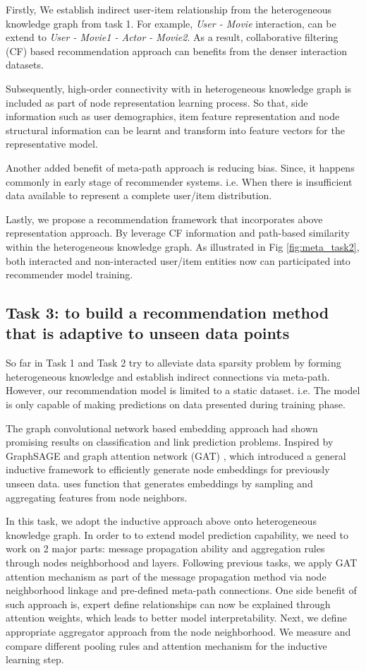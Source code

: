 Firstly, We establish indirect user-item relationship from the heterogeneous knowledge graph from task 1. For example, \textit{User - Movie} interaction, can be extend to \textit{User - Movie1 - Actor - Movie2}. As a result, collaborative filtering (CF) based recommendation approach can benefits from the denser interaction datasets. 

Subsequently, high-order connectivity with in heterogeneous knowledge graph is included as part of node representation learning process. So that, side information such as user demographics, item feature representation and node structural information can be learnt and transform into feature vectors for the representative model. 

Another added benefit of meta-path approach is reducing bias. Since, it happens commonly in early stage of recommender systems. i.e. When there is insufficient data available to represent a complete user/item distribution. 

Lastly, we propose a recommendation framework that incorporates above representation approach. By leverage CF information and path-based similarity within the heterogeneous knowledge graph. As illustrated in Fig \ref{fig:meta_task2}, both interacted and non-interacted user/item entities now can participated into recommender model training.

\subsection*{Task 3: to build a recommendation method that is adaptive to unseen data points}

So far in Task 1 and Task 2 try to alleviate data sparsity problem by forming heterogeneous knowledge and establish indirect connections via meta-path. However, our recommendation model is limited to a static dataset. i.e. The model is only capable of making predictions on data presented during training phase. 

The graph convolutional network based embedding approach had shown promising results on classification and link prediction problems. Inspired by GraphSAGE \citep{hamilton2017inductive} and graph attention network (GAT) \citep{velivckovic2017graph}, which introduced a general inductive framework to efficiently generate node embeddings for previously unseen data. \citet{hamilton2017inductive} uses function that generates embeddings by sampling and aggregating features from node neighbors.

In this task, we adopt the inductive approach above onto heterogeneous knowledge graph. In order to to extend model prediction capability, we need to work on 2 major parts: message propagation ability and aggregation rules through nodes neighborhood and layers. 
Following previous tasks, we apply GAT attention mechanism as part of the message propagation method via node neighborhood linkage and pre-defined meta-path connections. One side benefit of such approach is, expert define relationships can now be explained through attention weights, which leads to better model interpretability.
Next, we define appropriate aggregator approach from the node neighborhood. We measure and compare different pooling rules and attention mechanism for the inductive learning step.

